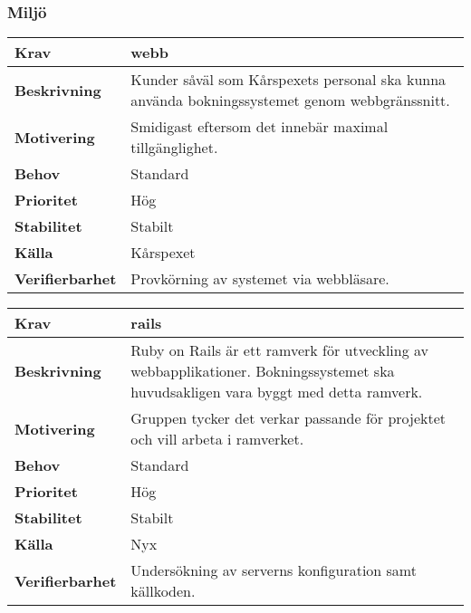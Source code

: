 \documentclass[a4paper, twoside, 11pt, titlepage]{article}
\begin{document}
	\subsubsection{Miljö}


		\begin{tabular} { | p{3cm} | p{12.2cm} | }
			\hline
			\textbf{Krav} & webb  \\
			\hline
			\textbf{Beskrivning} & Kunder såväl som Kårspexets personal ska kunna använda bokningssystemet genom webbgränssnitt.  \\
			\hline
			\textbf{Motivering} & Smidigast eftersom det innebär maximal tillgänglighet.  \\
			\hline
			\textbf{Behov} & Standard  \\
			\hline
			\textbf{Prioritet} & Hög  \\
			\hline
			\textbf{Stabilitet} & Stabilt  \\
			\hline
			\textbf{Källa} & Kårspexet  \\
			\hline
			\textbf{Verifierbarhet} & Provkörning av systemet via webbläsare.  \\
			\hline
		\end{tabular}

		\begin{tabular} { | p{3cm} | p{12.2cm} | }
			\hline
			\textbf{Krav} & rails  \\
			\hline
			\textbf{Beskrivning} & Ruby on Rails är ett ramverk för utveckling av webbapplikationer. Bokningssystemet ska huvudsakligen vara byggt med detta ramverk.  \\
			\hline
			\textbf{Motivering} & Gruppen tycker det verkar passande för projektet och vill arbeta i ramverket.  \\
			\hline
			\textbf{Behov} & Standard  \\
			\hline
			\textbf{Prioritet} & Hög  \\
			\hline
			\textbf{Stabilitet} & Stabilt  \\
			\hline
			\textbf{Källa} & Nyx  \\
			\hline
			\textbf{Verifierbarhet} & Undersökning av serverns konfiguration samt källkoden.  \\
			\hline
		\end{tabular}
\end{document}
